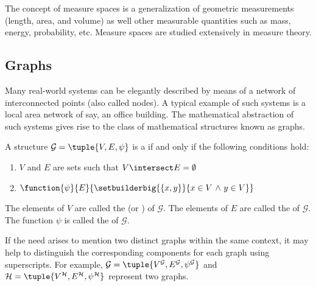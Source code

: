\noindent
The concept of measure spaces is a generalization of geometric measurements (length, area, and volume) as well other measurable quantities such
as mass, energy, probability, etc. Measure spaces are studied extensively in measure theory.

\subsection{Graphs}
Many real-world systems can be elegantly described by means of a network of interconnected points (also called nodes).
A typical example of such systems is a local area network of say, an office building.
The mathematical abstraction of such systems gives rise to the class of mathematical structures known as graphs.

\begin{dfn}[Graph]
     \label{dfn:graph}
    A structure \( \mathcal{G} = \tuple{V, E, \psi} \) is a  if and only if the following conditions hold:
    \begin{enumerate}[topsep=2pt,label=\textup{\texttt{(\alph*)}}]
        \item \( V \) and \( E \) are sets such that \( V \intersect E = \emptyset \)
        \item \( \function{\psi}{E}{\setbuilderbig{ \mleft\{ x,y \mright\} }{x \in V \,\,{\land}\,\, y \in V}} \)
    \end{enumerate}
    The elements of \( V \) are called the  (or ) of \( \mathcal{G} \).
    The elements of \( E \) are called the  of \( \mathcal{G} \).
    The function \( \psi \) is called the  of \( \mathcal{G} \).
\end{dfn}

\begin{notation}
    If the need arises to mention two distinct graphs within the same context,
    it may help to distinguish the corresponding components for each graph using superscripts.
    For example, \( \mathcal{G} = \tuple{V^{\mathcal{G}}, E^{\mathcal{G}}, \psi^{\mathcal{G}}} \) and
    \( \mathcal{H} = \tuple{V^{\mathcal{H}}, E^{\mathcal{H}}, \psi^{\mathcal{H}}} \) represent two graphs.
\end{notation}

